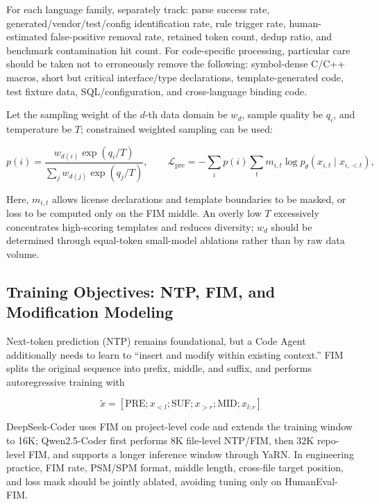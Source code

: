 \documentclass[10pt,a4paper,UTF8,fontset=none]{ctexart}
\begin{document}
For each language family, separately track: parse success rate, generated/vendor/test/config identification rate, rule trigger rate, human-estimated false-positive removal rate, retained token count, dedup ratio, and benchmark contamination hit count. For code-specific processing, particular care should be taken not to erroneously remove the following: symbol-dense C/C++ macros, short but critical interface/type declarations, template-generated code, test fixture data, SQL/configuration, and cross-language binding code.

Let the sampling weight of the $d$-th data domain be $w_d$, sample quality be $q_i$, and temperature be $T$; constrained weighted sampling can be used:

\begin{equation}
p(i)=\frac{w_{d(i)}\exp(q_i/T)}{\sum_j w_{d(j)}\exp(q_j/T)},
\qquad
\mathcal{L}_{\mathrm{pre}}=-\sum_i p(i)\sum_t m_{i,t}\log p_\theta(x_{i,t}\mid x_{i,<t}),
\label{eq:pretrain}
\end{equation}

Here, $m_{i,t}$ allows license declarations and template boundaries to be masked, or loss to be computed only on the FIM middle. An overly low $T$ excessively concentrates high-scoring templates and reduces diversity; $w_d$ should be determined through equal-token small-model ablations rather than by raw data volume.

\subsection{Training Objectives: NTP, FIM, and Modification Modeling}

Next-token prediction (NTP) remains foundational, but a Code Agent additionally needs to learn to ``insert and modify within existing context.'' FIM splits the original sequence into prefix, middle, and suffix, and performs autoregressive training with

\begin{equation}
\tilde{x}=[\mathrm{PRE};x_{<l};\mathrm{SUF};x_{>r};\mathrm{MID};x_{l:r}]
\label{eq:fim}
\end{equation}

DeepSeek-Coder uses FIM on project-level code and extends the training window to 16K\cite{guo2024deepseekcoder}; Qwen2.5-Coder first performs 8K file-level NTP/FIM, then 32K repo-level FIM, and supports a longer inference window through YaRN\cite{hui2024qwen25coder}. In engineering practice, FIM rate, PSM/SPM format, middle length, cross-file target position, and loss mask should be jointly ablated, avoiding tuning only on HumanEval-FIM.
\end{document}
